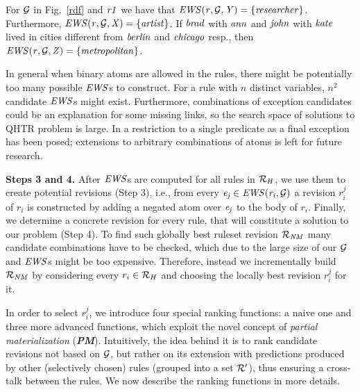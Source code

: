 \begin{example}
For $\mathcal{G}$ in Fig.~\ref{rdf} and $\mathit{r1}$ 
we have that $\mathit{EWS(r,\mathcal{G},Y)}=\{\mathit{researcher}\}$. Furthermore,
 $\mathit{EWS(r,\mathcal{G},X)}=\{\mathit{artist}\}$. If $\mathit{brad}$ with $\mathit{ann}$ and $\mathit{john}$ with $\mathit{kate}$ lived in cities different from $\mathit{berlin}$ and $\mathit{chicago}$ resp., then $\mathit{EWS(r,\mathcal{G},Z)}=\{\mathit{metropolitan}\}$. 
\end{example}
In general when binary atoms are allowed in the rules, there might be potentially too many possible $\mathit{EWS}$s to construct. 
For a rule with $n$ distinct variables, $n^2$ candidate $\mathit{EWS}$s might exist. Furthermore, combinations of exception candidates could be an explanation for some missing links, so the search space of solutions to QHTR problem is large. In \cite{rumis} a restriction to a single predicate as a final exception has been posed; extensions to arbitrary combinations of atoms is left for future research.





\noindent \textbf{Steps 3 and 4.} After $\mathit{EWS}$s are computed for all rules in $\mathcal{R}_H$, we use
them to create potential revisions (Step 3), i.e., from every $\mathit{e_j}\in \mathit{EWS(r_i,\mathcal{G})}$ a revision $r^j_i$ of $r_i$ is constructed by adding a negated atom over $\mathit{e_j}$ to the body of $r_i$. Finally, we determine a concrete
revision for every rule, that will constitute a solution to our problem (Step 4). To find such globally best ruleset revision $\mathcal{R}_{\mathit{NM}}$ many candidate combinations have to be checked, which due to the large size of our $\mathcal{G}$ and $\mathit{EWS}$s might be too expensive. Therefore, instead %
we incrementally build $\mathcal{R}_{\mathit{NM}}$ by considering every $r_i \in
\mathcal{R}_{H}$ and choosing the locally best revision $r^j_i$ %
for it.

In order to select %
$r^j_i$, we introduce four special ranking functions: a naive one and three more advanced functions, which exploit the novel concept of \emph{partial materialization} (\textbf{\em PM}). Intuitively, the idea behind it is to rank candidate revisions not based on $\mathcal{G}$, but rather on its extension with predictions produced by other (selectively chosen) rules (grouped into a set $\mathcal{R}'$), thus ensuring a cross-talk between the rules. We now describe the ranking functions in more details.

